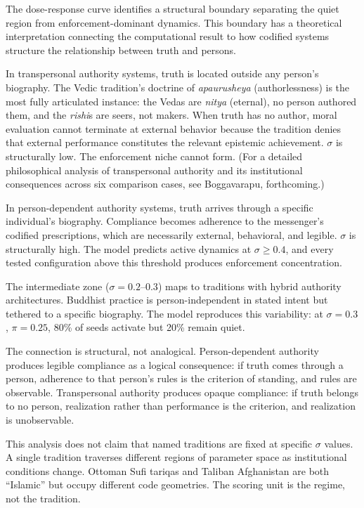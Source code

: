 \documentclass[12pt]{article}
\begin{document}
The dose-response curve identifies a structural boundary separating the
quiet region from enforcement-dominant dynamics. This boundary has a
theoretical interpretation connecting the computational result to how
codified systems structure the relationship between truth and persons.

In transpersonal authority systems, truth is located outside any person's
biography. The Vedic tradition's doctrine of \emph{apaurusheya}
(authorlessness) is the most fully articulated instance: the Vedas are
\emph{nitya} (eternal), no person authored them, and the \emph{rishi}s
are seers, not makers. When truth has no author, moral evaluation cannot
terminate at external behavior because the tradition denies that external
performance constitutes the relevant epistemic achievement. $\sigma$ is
structurally low. The enforcement niche cannot form. (For a detailed
philosophical analysis of transpersonal authority and its institutional
consequences across six comparison cases, see Boggavarapu, forthcoming.)

In person-dependent authority systems, truth arrives through a specific
individual's biography. Compliance becomes adherence to the messenger's
codified prescriptions, which are necessarily external, behavioral, and
legible. $\sigma$ is structurally high. The model predicts active
dynamics at $\sigma \geq 0.4$, and every tested configuration above this
threshold produces enforcement concentration.

The intermediate zone ($\sigma = 0.2$--$0.3$) maps to traditions with
hybrid authority architectures. Buddhist practice is person-independent
in stated intent but tethered to a specific biography. The model
reproduces this variability: at $\sigma = 0.3$, $\pi = 0.25$, 80\% of
seeds activate but 20\% remain quiet.

The connection is structural, not analogical. Person-dependent authority
produces legible compliance as a logical consequence: if truth comes
through a person, adherence to that person's rules is the criterion of
standing, and rules are observable. Transpersonal authority produces
opaque compliance: if truth belongs to no person, realization rather than
performance is the criterion, and realization is unobservable.

This analysis does not claim that named traditions are fixed at specific
$\sigma$ values. A single tradition traverses different regions of
parameter space as institutional conditions change. Ottoman Sufi tariqas
and Taliban Afghanistan are both ``Islamic'' but occupy different code
geometries. The scoring unit is the regime, not the tradition.
\end{document}
